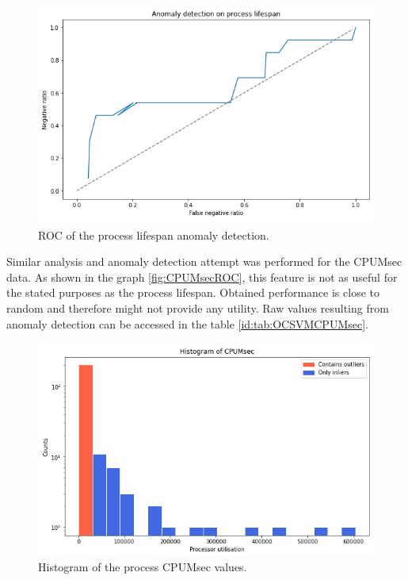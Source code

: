 \documentclass[a4paper,twoside,12pt]{book}
\begin{document}
\begin{figure}
	\centering
	\includegraphics[scale=0.9]{images/ROClifespan}
	\caption{ROC of the process lifespan anomaly detection.}
	\label{fig:lifespanROC}
 \end{figure}

 Similar analysis and anomaly detection attempt was performed for the CPUMsec data. As shown in the graph \ref{fig:CPUMsecROC}, this 
 feature is not as useful for the stated purposes as the process lifespan. Obtained performance is close to random and therefore might
 not provide any utility. Raw values resulting from anomaly detection can be accessed in the table \ref{id:tab:OCSVMCPUMsec}.

 \begin{figure}
	\centering
	\includegraphics[scale=0.9]{images/CPUMsecHist}
	\caption{Histogram of the process CPUMsec values.}
	\label{fig:cpumsecHist}
 \end{figure}
 
\end{document}
